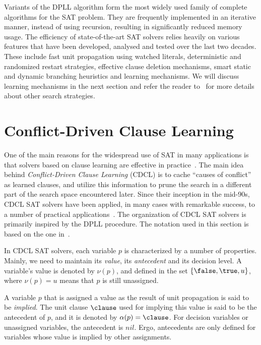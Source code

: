 Variants of the DPLL algorithm form the most widely used family of complete
algorithms for the SAT problem. They are frequently implemented in an iterative
manner, instead of using recursion, resulting in significantly reduced memory
usage. The efficiency of state-of-the-art SAT solvers relies heavily on various
features that have been developed, analysed and tested over the last two
decades. These include fast unit propagation using watched literals,
deterministic and randomized restart strategies, effective clause deletion
mechanisms, smart static and dynamic branching heuristics and learning
mechanisms. We will discuss learning mechanisms in the next section and refer
the reader to~\cite{satchapter} for more details about other search strategies.

\section{Conflict-Driven Clause Learning}%
\label{sec:cdcl}

One of the main reasons for the widespread use of SAT in many applications is
that solvers based on clause learning are effective in
practice~\cite{satchapter}. The main idea behind \emph{Conflict-Driven Clause
Learning} (CDCL) is to cache ``causes of conflict'' as learned clauses, and
utilize this information to prune the search in a different part of the search
space encountered later. Since their inception in the mid-90s, CDCL SAT solvers
have been applied, in many cases with remarkable success, to a number of
practical applications~\cite{cdclchapter}. The organization of CDCL SAT solvers
is primarily inspired by the DPLL procedure. The notation used in this section
is based on the one in~\cite{cdclchapter}.

In CDCL SAT solvers, each variable $p$ is characterized by a number of
properties. Mainly, we need to maintain its \emph{value}, its \emph{antecedent}
and its decision level.  A variable's value is denoted by $\nu(p)$, and defined
in the set $\{\false, \true, u\}$, where $\nu(p) = u$ means that $p$ is still
unassigned. 

A variable $p$ that is assigned a value as the result of unit propagation is
said to be \emph{implied}.  The unit clause $\clause$ used for implying this
value is said to be the antecedent of $p$, and it is denoted by $\alpha(p) =
\clause$. For decision variables or unassigned variables, the antecedent is
$nil$. Ergo, antecedents are only defined for variables whose value is implied
by other assignments. 

